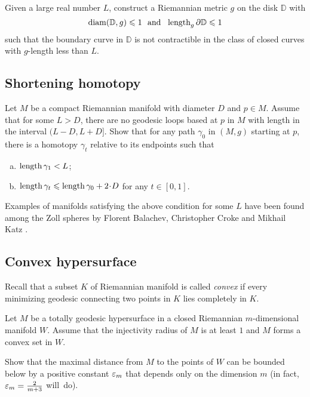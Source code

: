 \begin{pr}
Given a large real number $L$,
construct a Riemannian metric $g$ on the disk $\mathbb D$ 
with 
\[\diam(\mathbb D,g)\le 1
\ \ 
\text{and}
\ \ 
\length_g \partial\mathbb D\le 1  \]
such that the boundary curve in $\mathbb D$ is not contractible in the class of closed curves with $g$-length less than $L$.
\end{pr}

\subsection*{Shortening homotopy}
\label{short-homotopy}

\begin{pr}
Let $M$ be a compact Riemannian manifold with diameter $D$ and $p\in M$.
Assume that for some $L>D$,
there are no geodesic loops based at $p$ in $M$
with length in the interval $(L-D,L+ D]$.
Show that for any path $\gamma_0$ in $(M,g)$ starting at $p$, 
there is a homotopy $\gamma_t$ relative to its endpoints
such that 
\begin{enumerate}[a)]
\item $\operatorname{\rm length} \gamma_1<L$;
\item $\length \gamma_t\le \length \gamma_0+2\cdot D$ for any $t\in[0,1]$.
 
\end{enumerate}
\end{pr}

Examples of manifolds satisfying the above condition for some $L$ have been found among the Zoll spheres
by Florent Balachev, Christopher Croke and Mikhail Katz \cite{balacheff-croke-katz}.



\subsection*{Convex hypersurface}
\label{Convex hypersurface}

Recall that a subset $K$ of Riemannian manifold is called \emph{convex} if every minimizing geodesic connecting two  points in $K$ lies completely in $K$. 

\begin{pr}
Let $M$ be a totally geodesic hypersurface 
in a closed Riemannian $m$-dimensional manifold $W$.
Assume that the injectivity radius of $M$ is at least $1$
and $M$ forms a convex set in $W$.

Show that the maximal distance from $M$ to the points of $W$ can be bounded below by a positive constant $\varepsilon_m$ that depends only on the dimension $m$ (in fact, $\varepsilon_m=\tfrac2{m+3}$ will~do).
\end{pr}

